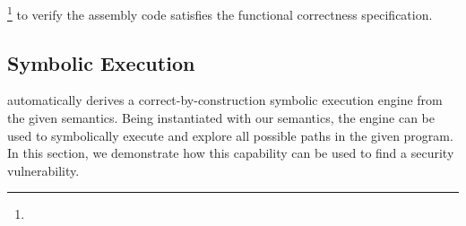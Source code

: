 



\footnote{%
} to verify the  assembly code satisfies the functional correctness specification.




\subsection{Symbolic Execution}
\label{sec:Appl:Security}

\K automatically derives a correct-by-construction symbolic execution engine from the given semantics.
Being instantiated with our semantics, the engine can be used to symbolically execute and explore all possible paths in the given \ISA program.
In this section, we demonstrate how this capability can be used to find a  security vulnerability.


